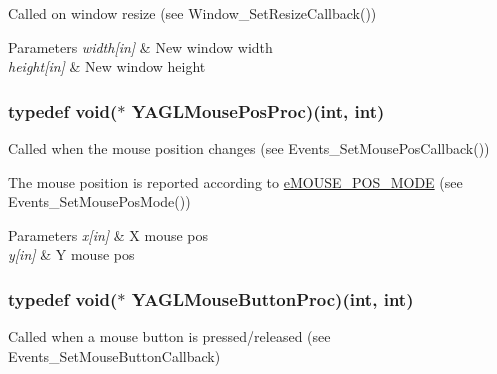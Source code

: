 Called on window resize (see Window\-\_\-\-Set\-Resize\-Callback()) 


\begin{DoxyParams}{Parameters}
{\em width\mbox{[}in\mbox{]}} & New window width \\
\hline
{\em height\mbox{[}in\mbox{]}} & New window height \\
\hline
\end{DoxyParams}
\hypertarget{group____callbacks_ga2eaebac73cb5723a5e6be9684f31e2d4}{
\subsubsection[{Y\-A\-G\-L\-Mouse\-Pos\-Proc}]{\setlength{\rightskip}{0pt plus 5cm}typedef void($\ast$ Y\-A\-G\-L\-Mouse\-Pos\-Proc)(int, int)}}\label{group____callbacks_ga2eaebac73cb5723a5e6be9684f31e2d4}


Called when the mouse position changes (see Events\-\_\-\-Set\-Mouse\-Pos\-Callback()) 

The mouse position is reported according to \hyperlink{group____enums_ga0aeff75213c3ae4bb8edd1f8a49a5225}{e\-M\-O\-U\-S\-E\-\_\-\-P\-O\-S\-\_\-\-M\-O\-D\-E} (see Events\-\_\-\-Set\-Mouse\-Pos\-Mode())


\begin{DoxyParams}{Parameters}
{\em x\mbox{[}in\mbox{]}} & X mouse pos \\
\hline
{\em y\mbox{[}in\mbox{]}} & Y mouse pos \\
\hline
\end{DoxyParams}
\hypertarget{group____callbacks_gaf531b934879174034c6a8e8c445c1796}{
\subsubsection[{Y\-A\-G\-L\-Mouse\-Button\-Proc}]{\setlength{\rightskip}{0pt plus 5cm}typedef void($\ast$ Y\-A\-G\-L\-Mouse\-Button\-Proc)(int, int)}}\label{group____callbacks_gaf531b934879174034c6a8e8c445c1796}


Called when a mouse button is pressed/released (see Events\-\_\-\-Set\-Mouse\-Button\-Callback) 



